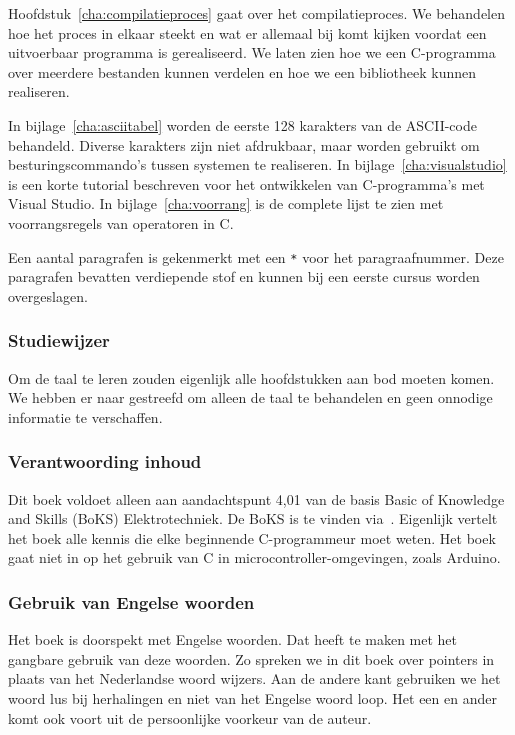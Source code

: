 Hoofdstuk~\ref{cha:compilatieproces} gaat over het compilatieproces. We behandelen hoe het proces in elkaar steekt en wat er allemaal bij komt kijken voordat een uitvoerbaar programma is gerealiseerd. We laten zien hoe we een C-programma over meerdere bestanden kunnen verdelen en hoe we een bibliotheek kunnen realiseren.

In bijlage~\ref{cha:asciitabel} worden de eerste 128 karakters van de ASCII-code behandeld. Diverse karakters zijn niet afdrukbaar, maar worden gebruikt om besturingscommando's tussen systemen te realiseren. In bijlage~\ref{cha:visualstudio} is een korte tutorial beschreven voor het ontwikkelen van C-programma's met Visual Studio. In bijlage~\ref{cha:voorrang} is de complete lijst te zien met voorrangsregels van operatoren in C.

Een aantal paragrafen is gekenmerkt met een \texttt{*} voor het paragraafnummer. Deze paragrafen bevatten verdiepende stof en kunnen bij een eerste cursus worden overgeslagen.

\subsubsection*{Studiewijzer}
Om de taal te leren zouden eigenlijk alle hoofdstukken aan bod moeten komen. We hebben er naar gestreefd om alleen de taal te behandelen en geen onnodige informatie te verschaffen. 

\subsubsection*{Verantwoording inhoud}
Dit boek voldoet alleen aan aandachtspunt 4,01 van de basis Basic of Knowledge and Skills (BoKS) Elektrotechniek. De
BoKS is te vinden via~\cite{hboengineering2016boks}. Eigenlijk vertelt het boek alle kennis die elke beginnende C-programmeur moet weten. Het boek gaat niet in op het gebruik van C in microcontroller-omgevingen, zoals Arduino.

\subsubsection*{Gebruik van Engelse woorden}
Het boek is doorspekt met Engelse woorden. Dat heeft te maken met het gangbare gebruik van deze woorden. Zo spreken we in dit boek over pointers in plaats van het Nederlandse woord wijzers. Aan de andere kant gebruiken we het woord lus bij herhalingen en niet van het Engelse woord loop. Het een en ander komt ook voort uit de persoonlijke voorkeur van de auteur.

